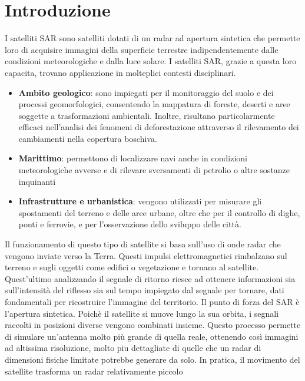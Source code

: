 
\chapter{Introduzione}

I satelliti SAR sono satelliti dotati di un radar ad apertura sintetica che permette loro di
acquisire immagini della superficie terrestre indipendentemente dalle condizioni meteorologiche 
e dalla luce solare. 
I satelliti SAR, grazie a questa loro capacita, trovano applicazione in molteplici contesti 
disciplinari.
\begin{itemize}
    \item \textbf{Ambito geologico}: sono impiegati per il monitoraggio del suolo e dei processi 
          geomorfologici, consentendo la mappatura di foreste, deserti e aree soggette a 
          trasformazioni ambientali. Inoltre, risultano particolarmente efficaci nell’analisi 
          dei fenomeni di deforestazione attraverso il rilevamento dei cambiamenti nella 
          copertura boschiva.
    \item \textbf{Marittimo}: permettono di localizzare navi anche in condizioni meteorologiche 
          avverse e di rilevare sversamenti di petrolio o altre sostanze inquinanti
    \item \textbf{Infrastrutture e urbanistica}: vengono utilizzati per misurare gli spostamenti del 
          terreno e delle aree urbane, oltre che per il controllo di dighe, ponti e ferrovie, 
          e per l’osservazione dello sviluppo delle città.
\end{itemize}
Il funzionamento di questo tipo di satellite si basa sull'uso di  onde radar 
che vengono inviate verso la Terra. Questi impulsi elettromagnetici rimbalzano sul terreno e sugli 
oggetti come edifici o vegetazione e tornano al satellite. Quest'ultimo analizzando il segnale di 
ritorno riesce ad ottenere informazioni sia sull'intensità del riflesso sia sul tempo impiegato 
dal segnale per tornare, dati fondamentali per ricostruire l'immagine del territorio. Il punto 
di forza del SAR è l'apertura sintetica. Poichè il satellite si muove lungo la sua orbita, i 
segnali raccolti in posizioni diverse vengono combinati insieme. Questo processo permette di 
simulare un'antenna molto più grande di quella reale, ottenendo così immagini ad altissima 
risoluzione, molto piu dettagliate di quelle che un radar di dimensioni fisiche limitate potrebbe 
generare da solo. In pratica, il movimento del satellite trasforma un radar relativamente piccolo 
